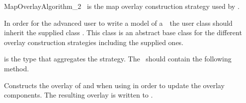 
\ccRefPageBegin


\renewcommand{\ccRefPageBegin}{\begin{ccAdvanced}}
\renewcommand{\ccRefPageEnd}{\end{ccAdvanced}}

\begin{ccRefConcept}{MapOverlayAlgorithm_2}
\label{OVL_sec:base}
\ccDefinition
\ccRefName\ is the map overlay construction strategy used by .

In order for the advanced user to write a model of a~\ccRefName\ 
the user class should inherit the \cgal\/ supplied class 
.
This class is an abstract base class for the different overlay 
construction strategies including the supplied ones.

 is the
type that aggregates the strategy. 
The \ccRefName\ should contain the following method.


\ccOperations
{}

   {Constructs the overlay of  and  when 
      using \ccStyle{notifier} in order to update the overlay components.
      The resulting overlay is written to \ccStyle{result}.}

\ccHasModels
   \\
   \\

\end{ccRefConcept}
\renewcommand{\ccRefPageBegin}{}
\renewcommand{\ccRefPageEnd}{}

\ccRefPageEnd
